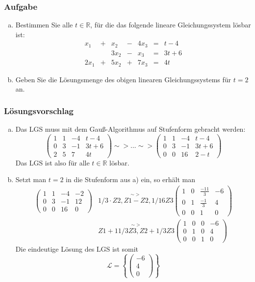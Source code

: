 \documentclass[a4paper,11pt]{scrartcl}
\newcounter{auf}
\newcommand{\Aufgabe}%
        {\addtocounter{auf}{1} \subsubsection*{\rmfamily  Aufgabe \theauf \hspace{1em}} }
\newcommand{\RR}{\mathbb{R}}
\begin{document}
\newpage
\Aufgabe
\begin{enumerate}[a)]
\item Bestimmen Sie alle $t\in\RR$, für die das folgende lineare Gleichungssystem lösbar ist:
\[\begin{array}{rrrrrrrrr}
x_1&+&x_2&-&4x_3&=&t-4\\
&&3x_2&-&x_3&=&3t+6\\
2x_1&+&5x_2&+&7x_3&=&4t
\end{array}\]
\item Geben Sie die Lösungsmenge des obigen linearen Gleichungssystems für $t=2$ an.
\end{enumerate}
%
%
\subsubsection*{Lösungsvorschlag}
\begin{enumerate}[a)]
\item Das LGS muss mit dem Gauß-Algorithmus auf Stufenform gebracht werden:
$$
\left( \begin{array}{ccc|c} 1&1&-4&t-4\\
0&3&-1&3t+6\\
2&5&7&4t \end{array}\right) \sim> ... \sim> \left( \begin{array}{ccc|c} 1&1&-4&t-4\\0&3&-1 & 3t+6 \\ 0&0&16&2-t \end{array} \right)
$$
Das LGS ist also für alle $t \in \RR$ lösbar.
\item Setzt man $t=2$ in die Stufenform aus a) ein, so erhält man
\begin{align*}
\left( \begin{array}{ccc|c} 1&1&-4&-2\\0&3&-1 & 12 \\ 0&0&16&0 \end{array}\right) &\stackrel{\sim>}{1/3\cdot Z2, Z1- Z2, 1/16Z3}\left( \begin{array}{ccc|c} 1&0&\frac{-11}{3}&-6\\0&1&\frac{-1}{3} & 4 \\ 0&0&1&0 \end{array} \right)\\
&\stackrel{\sim>}{Z1+11/3Z3, Z2+1/3Z3}\left( \begin{array}{ccc|c} 1&0&0&-6\\0&1&0 & 4 \\ 0&0&1&0 \end{array} \right)
\end{align*}
Die eindeutige Lösung des LGS ist somit
$$
\mathcal{L}=\left\{ \begin{pmatrix}-6\\4\\0 \end{pmatrix}  \right\}
$$
\end{enumerate}
\end{document}
